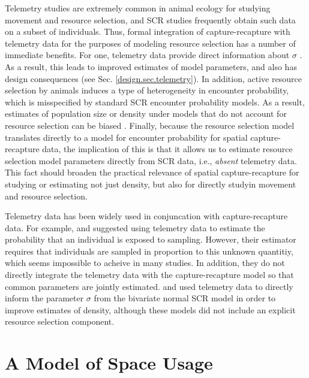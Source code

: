 Telemetry studies are extremely common in animal ecology for studying
movement and resource selection, and SCR studies frequently obtain
such data on a subset of individuals. Thus, formal integration of
capture-recapture with telemetry data for the purposes of modeling
resource selection has a number of immediate benefits. For one,
telemetry data provide direct information about $\sigma$
\citep{sollmann_etal:2012ecol,sollmann_etal:inprepjapplecol}. As a
result, this leads to improved estimates of model parameters, and also
has design consequences (see Sec. \ref{design.sec.telemetry}).  In
addition, active resource selection by animals induces a type of
heterogeneity in encounter probability, which is misspecified by
standard SCR encounter probability models. As a result, estimates of
population size or density under models that do not account for
resource selection can be biased \citep{royle_etal:2012mee}.  Finally,
because the resource selection model translates directly to a model
for encounter probability for spatial capture-recapture data, the
implication of this is that it allows us to estimate resource
selection model parameters directly from SCR data, i.e., {\it absent}
telemetry data. This fact should broaden the practical relevance of
spatial capture-recapture for studying or estimating not just density,
but also for directly studyin movement and resource selection.

Telemetry data has been widely used in conjuncation with
capture-recapture data.  For example, \citet{white_shenk:2001} and
\citet{ivan:2012} suggested using telemetry data to estimate the
probability that an individual is exposed to sampling. However, their
estimator requires that individuals are sampled in proportion to this
unknown quantitiy, which seems impossible to acheive in many
studies. In addition, they do not directly integrate the telemetry
data with the capture-recapture model so that common parameters are
jointly estimated.  \citet{sollmann_etal:inprepjapplecol} and
\citet{sollmann_etal:2012ecol} used telemetry data to directly inform
the parameter $\sigma$ from the bivariate normal SCR model in order to
improve estimates of density, although these models did not include an
explicit resource selection component.







\section{A Model of Space Usage}
\label{rsf.sec.rsfmodel}

